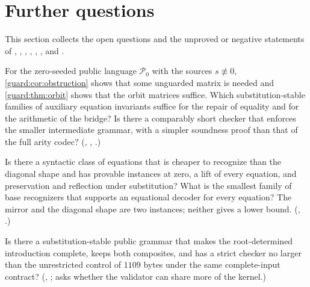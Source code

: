 \section{Further questions}
\label{guard:sec:questions}

This section collects the open questions and the unproved or negative
statements of , ,
, , ,
,  and .

\begin{question}
\label{guard:q:minimal}
For the zero-seeded public language $\mathcal P_0$ with the sources
$s\not\equiv 0$, \cref{guard:cor:obstruction} shows that some unguarded
matrix is needed and \cref{guard:thm:orbit} shows that the orbit matrices
suffice.  Which substitution-stable families of auxiliary equation
invariants suffice for the repair of equality and for the arithmetic of the
bridge?  Is there a comparably short checker that enforces the smaller
intermediate grammar, with a simpler soundness proof than that of the full
arity codec?  (, ,
.)
\end{question}

\begin{question}
\label{guard:q:stable}
Is there a syntactic class of equations that is cheaper to recognize than
the diagonal shape and has provable instances at zero, a lift of every
equation, and preservation and reflection under substitution?  What is the
smallest family of base recognizers that supports an equational decoder for
every equation?  The mirror and the diagonal shape are two instances;
neither gives a lower bound.  (, .)
\end{question}

\begin{question}
\label{guard:q:validator}
Is there a substitution-stable public grammar that makes the root-determined
introduction complete, keeps both composites, and has a strict checker no
larger than the unrestricted control of $1109$ bytes under the same
complete-input contract?  (,
;  asks whether the
validator can share more of the kernel.)
\end{question}

